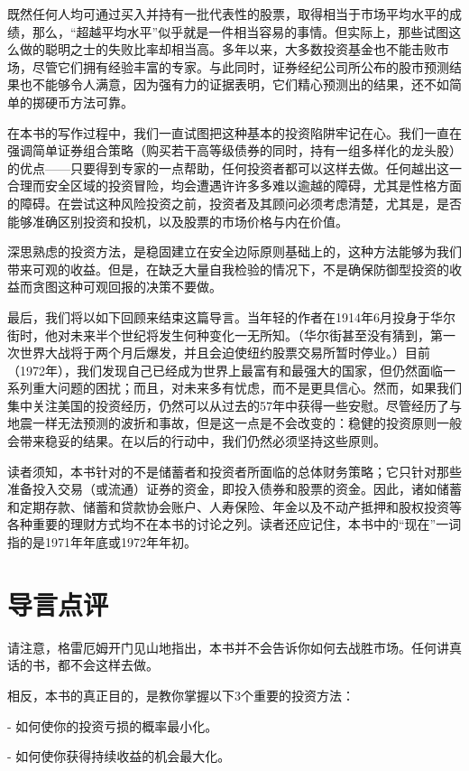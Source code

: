 \documentclass[12pt,oneside]{book}
\begin{document}
既然任何人均可通过买入并持有一批代表性的股票，取得相当于市场平均水平的成绩，那么，“超越平均水平”似乎就是一件相当容易的事情。但实际上，那些试图这么做的聪明之士的失败比率却相当高。多年以来，大多数投资基金也不能击败市场，尽管它们拥有经验丰富的专家。与此同时，证券经纪公司所公布的股市预测结果也不能够令人满意，因为强有力的证据表明，它们精心预测出的结果，还不如简单的掷硬币方法可靠。

在本书的写作过程中，我们一直试图把这种基本的投资陷阱牢记在心。我们一直在强调简单证券组合策略（购买若干高等级债券的同时，持有一组多样化的龙头股）的优点——只要得到专家的一点帮助，任何投资者都可以这样去做。任何越出这一合理而安全区域的投资冒险，均会遭遇许许多多难以逾越的障碍，尤其是性格方面的障碍。在尝试这种风险投资之前，投资者及其顾问必须考虑清楚，尤其是，是否能够准确区别投资和投机，以及股票的市场价格与内在价值。

深思熟虑的投资方法，是稳固建立在安全边际原则基础上的，这种方法能够为我们带来可观的收益。但是，在缺乏大量自我检验的情况下，不是确保防御型投资的收益而贪图这种可观回报的决策不要做。

最后，我们将以如下回顾来结束这篇导言。当年轻的作者在1914年6月投身于华尔街时，他对未来半个世纪将发生何种变化一无所知。（华尔街甚至没有猜到，第一次世界大战将于两个月后爆发，并且会迫使纽约股票交易所暂时停业。）目前（1972年），我们发现自己已经成为世界上最富有和最强大的国家，但仍然面临一系列重大问题的困扰；而且，对未来多有忧虑，而不是更具信心。然而，如果我们集中关注美国的投资经历，仍然可以从过去的57年中获得一些安慰。尽管经历了与地震一样无法预测的波折和事故，但是这一点是不会改变的：稳健的投资原则一般会带来稳妥的结果。在以后的行动中，我们仍然必须坚持这些原则。

读者须知，本书针对的不是储蓄者和投资者所面临的总体财务策略；它只针对那些准备投入交易（或流通）证券的资金，即投入债券和股票的资金。因此，诸如储蓄和定期存款、储蓄和贷款协会账户、人寿保险、年金以及不动产抵押和股权投资等各种重要的理财方式均不在本书的讨论之列。读者还应记住，本书中的“现在”一词指的是1971年年底或1972年年初。

\section{导言点评}
请注意，格雷厄姆开门见山地指出，本书并不会告诉你如何去战胜市场。任何讲真话的书，都不会这样去做。

相反，本书的真正目的，是教你掌握以下3个重要的投资方法：

- 如何使你的投资亏损的概率最小化。

- 如何使你获得持续收益的机会最大化。
\end{document}
